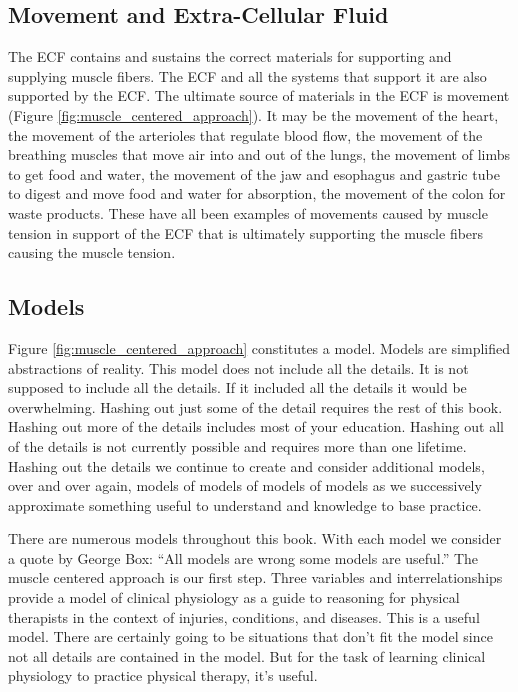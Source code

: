 \subsection{Movement and Extra-Cellular Fluid}

The ECF contains and sustains the correct materials for supporting and supplying muscle fibers. The ECF and all the systems that support it are also supported by the ECF. The ultimate source of materials in the ECF is movement (Figure \ref{fig:muscle_centered_approach}). It may be the movement of the heart, the movement of the arterioles that regulate blood flow, the movement of the breathing muscles that move air into and out of the lungs, the movement of limbs to get food and water, the movement of the jaw and esophagus and gastric tube to digest and move food and water for absorption, the movement of the colon for waste products. These have all been examples of movements caused by muscle tension in support of the ECF that is ultimately supporting the muscle fibers causing the muscle tension.



\subsection{Models}

Figure \ref{fig:muscle_centered_approach} constitutes a model. Models are simplified abstractions of reality. This model does not include all the details. It is not supposed to include all the details. If it included all the details it would be overwhelming. Hashing out just some of the detail requires the rest of this book. Hashing out more of the details includes most of your education. Hashing out all of the details is not currently possible and requires more than one lifetime.\footnotemark{} Hashing out the details we continue to create and consider additional models, over and over again, models of models of models of models as we successively approximate something useful to understand and knowledge to base practice.

There are numerous models throughout this book. With each model we consider a quote by George Box: “All models are wrong some models are useful.” The muscle centered approach is our first step. Three variables and interrelationships provide a model of clinical physiology as a guide to reasoning for physical therapists in the context of injuries, conditions, and diseases. This is a useful model. There are certainly going to be situations that don’t fit the model since not all details are contained in the model. But for the task of learning clinical physiology to practice physical therapy, it's useful. 


